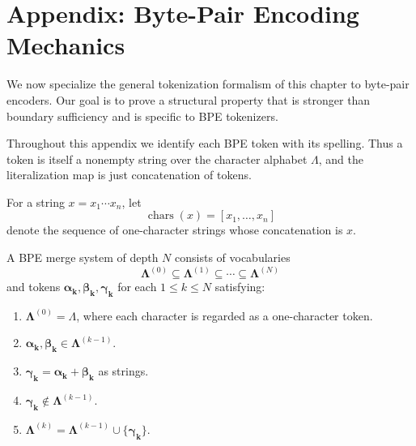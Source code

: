 \section{Appendix: Byte-Pair Encoding Mechanics}
\label{sec:appendix-bpe-mechanics}

We now specialize the general tokenization formalism of this chapter to byte-pair encoders.
Our goal is to prove a structural property that is stronger than boundary sufficiency and is
specific to BPE tokenizers.

Throughout this appendix we identify each BPE token with its spelling.
Thus a token is itself a nonempty string over the character alphabet $\Lambda$,
and the literalization map is just concatenation of tokens.

\begin{definition}
    For a string $x = x_1 \cdots x_n$, let
    \[
    \operatorname{chars}(x) = [x_1, \ldots, x_n]
    \]
    denote the sequence of one-character strings whose concatenation is $x$.
\end{definition}

\begin{definition}
    A BPE merge system of depth $N$ consists of vocabularies
    \[
    \boldsymbol{\Lambda}^{(0)} \subseteq \boldsymbol{\Lambda}^{(1)} \subseteq \cdots \subseteq \boldsymbol{\Lambda}^{(N)}
    \]
    and tokens $\boldsymbol{\alpha_k}, \boldsymbol{\beta_k}, \boldsymbol{\gamma_k}$ for each
    $1 \leq k \leq N$ satisfying:
    \begin{enumerate}
        \item $\boldsymbol{\Lambda}^{(0)} = \Lambda$, where each character is regarded as a one-character token.
        \item $\boldsymbol{\alpha_k}, \boldsymbol{\beta_k} \in \boldsymbol{\Lambda}^{(k-1)}$.
        \item $\boldsymbol{\gamma_k} = \boldsymbol{\alpha_k} + \boldsymbol{\beta_k}$ as strings.
        \item $\boldsymbol{\gamma_k} \notin \boldsymbol{\Lambda}^{(k-1)}$.
        \item $\boldsymbol{\Lambda}^{(k)} = \boldsymbol{\Lambda}^{(k-1)} \cup \{\boldsymbol{\gamma_k}\}$.
    \end{enumerate}
\end{definition}

